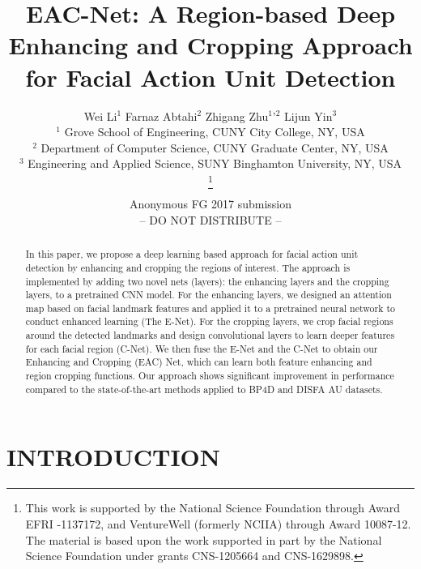 \documentclass[a4paper, 10pt, conference]{ieeeconf}      %
\title{\LARGE \bf
EAC-Net: A Region-based Deep Enhancing and Cropping Approach for Facial Action Unit Detection
}
\author{\parbox{16cm}{\centering
    {\large Wei Li$^1$   Farnaz Abtahi$^2$   Zhigang Zhu$^1$'$^2$   Lijun Yin$^3$ }\\
    {\normalsize
    $^1$ Grove School of Engineering, CUNY City College, NY, USA\\
    $^2$ Department of Computer Science, CUNY Graduate Center, NY, USA\\
    $^3$ Engineering and Applied Science, SUNY Binghamton University, NY, USA}}    
    \thanks{This work is supported by the National Science Foundation through Award EFRI -1137172, and VentureWell (formerly NCIIA) through Award 10087-12. The material is based upon the work supported in part by the National Science Foundation under grants CNS-1205664 and CNS-1629898.}%
}
\begin{document}
\ifFGfinal
\thispagestyle{empty}
\pagestyle{empty}
\else
\author{Anonymous FG 2017 submission\\-- DO NOT DISTRIBUTE --\\}
\pagestyle{plain}
\fi
\maketitle



\begin{abstract}

In this paper, we propose a deep learning based approach for facial action unit detection by enhancing and cropping the regions of interest. The approach is implemented by adding two novel nets (layers): the enhancing layers and the cropping layers, to a pretrained CNN model. For the enhancing layers, we designed an attention map based on facial landmark features and applied it to a pretrained neural network to conduct enhanced learning (The E-Net). For the cropping layers, we crop facial regions around the detected landmarks and design convolutional layers to learn deeper features for each facial region (C-Net). We then fuse the E-Net and the C-Net to obtain our Enhancing and Cropping (EAC) Net, which can learn both feature enhancing and region cropping functions. Our approach shows significant improvement in performance compared to the state-of-the-art methods applied to BP4D and DISFA AU datasets. 

\end{abstract}


\section{INTRODUCTION}
\end{document}
